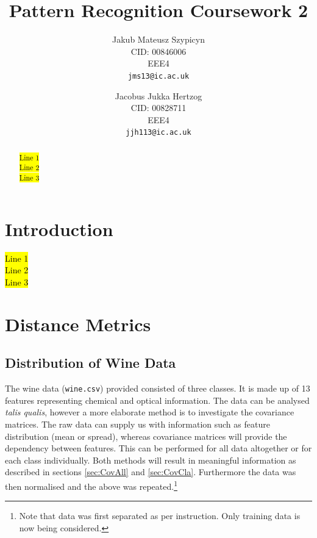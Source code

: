 \documentclass[10pt,twocolumn,letterpaper]{article}
\begin{document}
\title{Pattern Recognition Coursework 2}

\author{Jakub Mateusz Szypicyn\\
CID: 00846006\\
EEE4\\
{\tt\small jms13@ic.ac.uk}
\and
Jacobus Jukka Hertzog\\
CID: 00828711\\
EEE4\\
{\tt\small jjh113@ic.ac.uk}
}

\maketitle

\begin{abstract}
\hl{Line 1\\

Line 2\\

Line 3\\}
\end{abstract}

\section{Introduction}
\hl{Line 1\\

Line 2\\

Line 3\\}
\section{Distance Metrics}
\subsection{Distribution of Wine Data}

The wine data ({\tt\small wine.csv}) provided consisted of three classes. It is made up of 13 features representing chemical and optical information. The data can be analysed \textit{talis qualis}, however a more elaborate method is to investigate the covariance matrices. The raw data can supply us with information such as feature distribution (mean or spread), whereas covariance matrices will provide the dependency between features. This can be performed for all data altogether or for each class individually. Both methods will result in meaningful information as described in sections \ref{sec:CovAll} and \ref{sec:CovCla}. Furthermore the data was then normalised and the above was repeated.\footnote{Note that data was first separated as per instruction. Only training data is now being considered.} 
\end{document}

